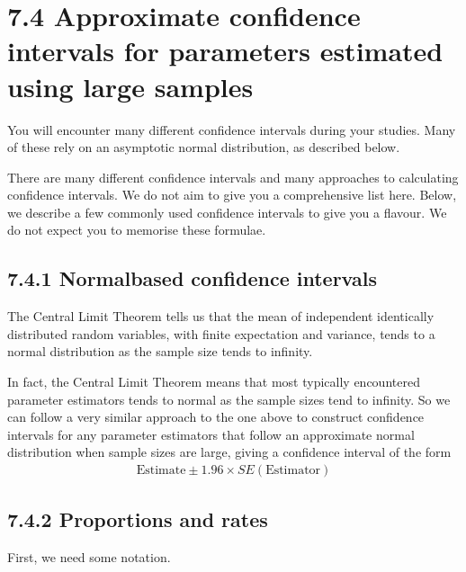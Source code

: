 \documentclass[letterpaper,10pt,english]{jupyterBook}
\begin{document}
\section{7.4 Approximate confidence intervals for parameters estimated using large samples}
\label{\detokenize{07.e. Frequentist I:approximate-confidence-intervals-for-parameters-estimated-using-large-samples}}\label{\detokenize{07.e. Frequentist I::doc}}
\sphinxAtStartPar
You will encounter many different confidence intervals during your studies. Many of these rely on an asymptotic normal distribution, as described below.

\sphinxAtStartPar
There are many different confidence intervals and many approaches to calculating confidence intervals. We do not aim to give you a comprehensive list here. Below, we describe a few commonly used confidence intervals to give you a flavour.  We do not expect you to memorise these formulae.


\subsection{7.4.1 Normal\sphinxhyphen{}based confidence intervals}
\label{\detokenize{07.e. Frequentist I:normal-based-confidence-intervals}}
\sphinxAtStartPar
The Central Limit Theorem tells us that the mean of independent identically distributed random variables, with finite expectation and variance, tends to a normal distribution as the sample size tends to infinity.

\sphinxAtStartPar
In fact, the Central Limit Theorem means that most typically encountered parameter estimators tends to normal as the sample sizes tend to infinity. So we can follow a very similar approach to the one above to construct confidence intervals for any parameter estimators that follow an approximate normal distribution when sample sizes are large, giving a confidence interval of the form
\begin{equation*}
\begin{split}
\mbox{Estimate} \pm 1.96 \times SE(\mbox{Estimator})
\end{split}
\end{equation*}

\subsection{7.4.2 Proportions and rates}
\label{\detokenize{07.e. Frequentist I:proportions-and-rates}}
\sphinxAtStartPar
First, we need some notation.
\end{document}
